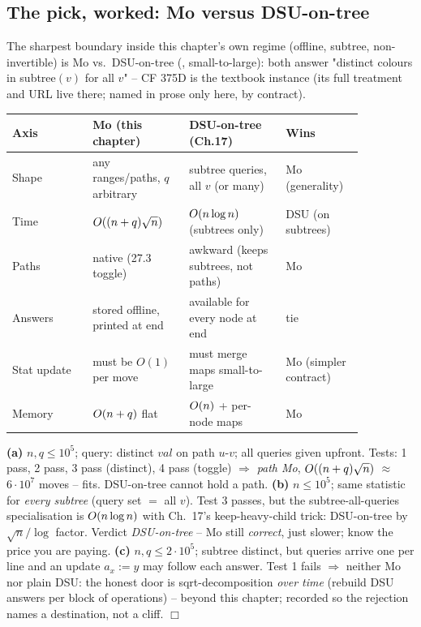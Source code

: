 \subsection{The pick, worked: Mo versus DSU-on-tree}

The sharpest boundary inside this chapter's own regime (offline, subtree,
non-invertible) is Mo vs.\ DSU-on-tree (, small-to-large): both
answer "distinct colours in subtree\((v)\) for all \(v\)" -- CF 375D is the
textbook instance (its full treatment and URL live there; named in prose only
here, by contract).

\begin{center}\renewcommand{\arraystretch}{1.25}\setlength{\tabcolsep}{3pt}
\begin{tabular}{@{}p{0.20\linewidth} p{0.24\linewidth} p{0.24\linewidth} >{\raggedright\arraybackslash}p{0.18\linewidth}@{}}
\toprule
\textbf{Axis} & \textbf{Mo (this chapter)} & \textbf{DSU-on-tree (Ch.17)} & \textbf{Wins}\\
\midrule
Shape & any ranges/paths, \(q\) arbitrary & subtree queries, all \(v\) (or many) & Mo (generality) \\
Time & \(O((n+q)\sqrt n)\) & \(O(n\log n)\) (subtrees only) & DSU (on subtrees) \\
Paths & native (27.3 toggle) & awkward (keeps subtrees, not paths) & Mo \\
Answers & stored offline, printed at end & available for every node at end & tie \\
Stat update & must be \(O(1)\) per move & must merge maps small-to-large & Mo (simpler contract) \\
Memory & \(O(n+q)\) flat & \(O(n)\) + per-node maps & Mo \\
\bottomrule
\end{tabular}
\end{center}

\begin{tracebox}
\textbf{(a)} \(n,q\le10^5\); query: distinct \(\mathit{val}\) on path \(u\)-\(v\);
all queries given upfront.  Tests: 1 pass, 2 pass, 3 pass (distinct), 4 pass
(toggle) \(\Rightarrow\) \emph{path Mo}, \(O((n+q)\sqrt n)\) \(\approx\)
\(6\cdot10^7\) moves -- fits.  DSU-on-tree cannot hold a path.
\textbf{(b)} \(n\le10^5\); same statistic for \emph{every subtree} (query set
\(=\) all \(v\)).  Test 3 passes, but the subtree-all-queries specialisation is
\(O(n\log n)\) with Ch.~17's keep-heavy-child trick: DSU-on-tree by
\(\sqrt n/\log\) factor.  Verdict \emph{DSU-on-tree} -- Mo still \emph{correct},
just slower; know the price you are paying.
\textbf{(c)} \(n,q\le2\cdot10^5\); subtree distinct, but queries arrive one per
line and an update \(a_x := y\) may follow each answer.  Test 1 fails
\(\Rightarrow\) neither Mo nor plain DSU: the honest door is sqrt-decomposition
\emph{over time} (rebuild DSU answers per block of operations) -- beyond this
chapter; recorded so the rejection names a destination, not a cliff. \(\Box\)
\end{tracebox}

